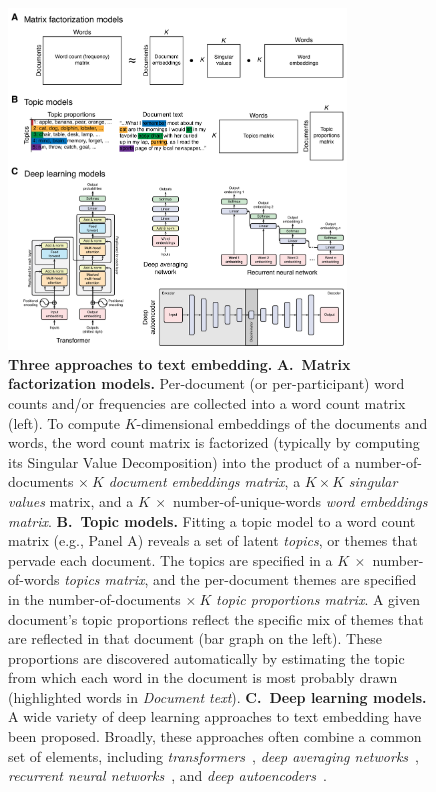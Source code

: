 \documentclass{article}
\begin{document}
\begin{figure}[tp]
\centering
\includegraphics[width=0.8\textwidth]{figs/word_embedding_models}
\caption{\textbf{Three approaches to text embedding.}  \textbf{A.~Matrix factorization models.} Per-document (or per-participant) word counts and/or frequencies are collected into a word count matrix (left).  To compute $K$-dimensional embeddings of the documents and words, the word count matrix is factorized (typically by computing its Singular Value Decomposition) into the product of a number-of-documents $\times~K$ \textit{document embeddings matrix}, a $K \times K$ \textit{singular values} matrix, and a $K~\times $ number-of-unique-words \textit{word embeddings matrix}.  \textbf{B.~Topic models.}  Fitting a topic model to a word count matrix (e.g., Panel A) reveals a set of latent \textit{topics}, or themes that pervade each document.  The topics are specified in a $K~\times$ number-of-words \textit{topics matrix}, and the per-document themes are specified in the number-of-documents $\times~K$ \textit{topic proportions matrix}. A given document's topic proportions reflect the specific mix of themes that are reflected in that document (bar graph on the left).  These proportions are discovered automatically by estimating the topic from which each word in the document is most probably drawn (highlighted words in \textit{Document text}).  \textbf{C.~Deep learning models.}  A wide variety of deep learning approaches to text embedding have been proposed.  Broadly, these approaches often combine a common set of elements, including \textit{transformers}~\citep[diagram adapted from][]{ViswEtal17}, \textit{deep averaging networks}~\citep[diagram adapted from][]{IyyeEtal15}, \textit{recurrent neural networks}~\citep[diagram adapted from][]{IyyeEtal15}, and \textit{deep autoencoders}~\citep[diagram adapted from][]{YousHame17}.}
\label{fig:embedding-models}
\end{figure}
\end{document}
